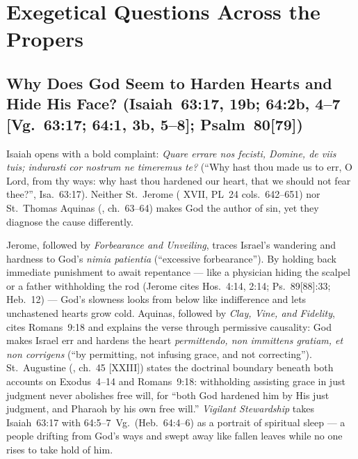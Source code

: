 \section{Exegetical Questions Across the Propers}
%

\subsection{Why Does God Seem to Harden Hearts and Hide His Face? (Isaiah~63:17, 19b; 64:2b, 4--7 [Vg.~63:17; 64:1, 3b, 5--8]; Psalm~80[79])}

Isaiah opens with a bold complaint: \emph{Quare errare nos fecisti, Domine, de viis tuis; indurasti cor nostrum ne timeremus te?} (``Why hast thou made us to err, O Lord, from thy ways: why hast thou hardened our heart, that we should not fear thee?'', Isa.~63:17). Neither St.~Jerome ( XVII, PL~24 cols.~642--651) nor St.~Thomas Aquinas (, ch.~63--64) makes God the author of sin, yet they diagnose the cause differently.

Jerome, followed by \emph{Forbearance and Unveiling}, traces Israel's wandering and hardness to God's \emph{nimia patientia} (``excessive forbearance''). By holding back immediate punishment to await repentance --- like a physician hiding the scalpel or a father withholding the rod (Jerome cites Hos.~4:14, 2:14; Ps.~89[88]:33; Heb.~12) --- God's slowness looks from below like indifference and lets unchastened hearts grow cold. Aquinas, followed by \emph{Clay, Vine, and Fidelity}, cites Romans~9:18 and explains the verse through permissive causality: God makes Israel err and hardens the heart \emph{permittendo, non immittens gratiam, et non corrigens} (``by permitting, not infusing grace, and not correcting''). St.~Augustine (, ch.~45 [XXIII]) states the doctrinal boundary beneath both accounts on Exodus~4--14 and Romans~9:18: withholding assisting grace in just judgment never abolishes free will, for ``both God hardened him by His just judgment, and Pharaoh by his own free will.'' \emph{Vigilant Stewardship} takes Isaiah~63:17 with 64:5--7~Vg.\ (Heb.~64:4--6) as a portrait of spiritual sleep --- a people drifting from God's ways and swept away like fallen leaves while no one rises to take hold of him.

